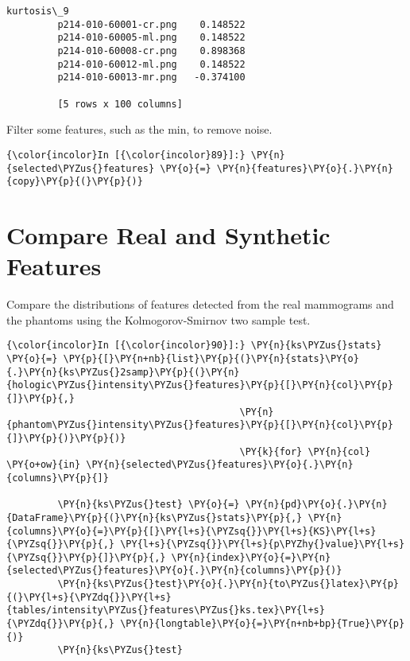 \begin{Verbatim}[commandchars=\\\{\}]
                                kurtosis\_9
         p214-010-60001-cr.png    0.148522
         p214-010-60005-ml.png    0.148522
         p214-010-60008-cr.png    0.898368
         p214-010-60012-ml.png    0.148522
         p214-010-60013-mr.png   -0.374100

         [5 rows x 100 columns]
\end{Verbatim}

    Filter some features, such as the min, to remove noise.

    \begin{Verbatim}[commandchars=\\\{\}]
{\color{incolor}In [{\color{incolor}89}]:} \PY{n}{selected\PYZus{}features} \PY{o}{=} \PY{n}{features}\PY{o}{.}\PY{n}{copy}\PY{p}{(}\PY{p}{)}
\end{Verbatim}

    \section{Compare Real and Synthetic
Features}\label{compare-real-and-synthetic-features}

    Compare the distributions of features detected from the real mammograms
and the phantoms using the Kolmogorov-Smirnov two sample test.

    \begin{Verbatim}[commandchars=\\\{\}]
{\color{incolor}In [{\color{incolor}90}]:} \PY{n}{ks\PYZus{}stats} \PY{o}{=} \PY{p}{[}\PY{n+nb}{list}\PY{p}{(}\PY{n}{stats}\PY{o}{.}\PY{n}{ks\PYZus{}2samp}\PY{p}{(}\PY{n}{hologic\PYZus{}intensity\PYZus{}features}\PY{p}{[}\PY{n}{col}\PY{p}{]}\PY{p}{,}
                                         \PY{n}{phantom\PYZus{}intensity\PYZus{}features}\PY{p}{[}\PY{n}{col}\PY{p}{]}\PY{p}{)}\PY{p}{)}
                                         \PY{k}{for} \PY{n}{col} \PY{o+ow}{in} \PY{n}{selected\PYZus{}features}\PY{o}{.}\PY{n}{columns}\PY{p}{]}

         \PY{n}{ks\PYZus{}test} \PY{o}{=} \PY{n}{pd}\PY{o}{.}\PY{n}{DataFrame}\PY{p}{(}\PY{n}{ks\PYZus{}stats}\PY{p}{,} \PY{n}{columns}\PY{o}{=}\PY{p}{[}\PY{l+s}{\PYZsq{}}\PY{l+s}{KS}\PY{l+s}{\PYZsq{}}\PY{p}{,} \PY{l+s}{\PYZsq{}}\PY{l+s}{p\PYZhy{}value}\PY{l+s}{\PYZsq{}}\PY{p}{]}\PY{p}{,} \PY{n}{index}\PY{o}{=}\PY{n}{selected\PYZus{}features}\PY{o}{.}\PY{n}{columns}\PY{p}{)}
         \PY{n}{ks\PYZus{}test}\PY{o}{.}\PY{n}{to\PYZus{}latex}\PY{p}{(}\PY{l+s}{\PYZdq{}}\PY{l+s}{tables/intensity\PYZus{}features\PYZus{}ks.tex}\PY{l+s}{\PYZdq{}}\PY{p}{,} \PY{n}{longtable}\PY{o}{=}\PY{n+nb+bp}{True}\PY{p}{)}
         \PY{n}{ks\PYZus{}test}
\end{Verbatim}

